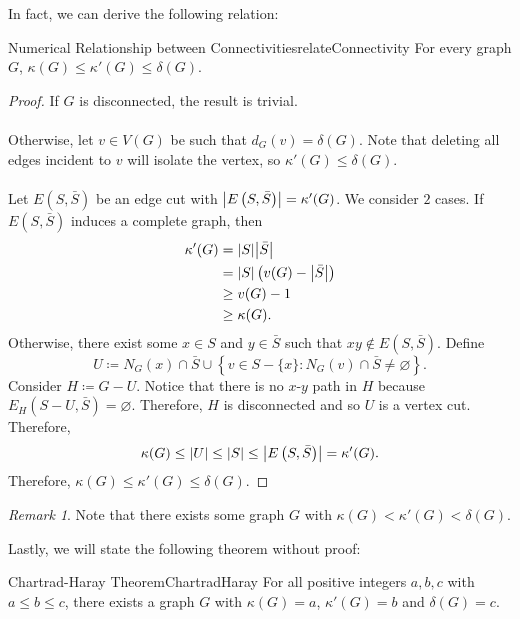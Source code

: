 \documentclass[math, code]{amznotes}
\theoremstyle{remark}
\newtheorem*{remark}{Remark}
\begin{document}
In fact, we can derive the following relation:
\begin{probox}{Numerical Relationship between Connectivities}{relateConnectivity}
    For every graph $G$, $\kappa(G) \leq \kappa'(G) \leq \delta(G)$.
    \tcblower
    \begin{proof}
        If $G$ is disconnected, the result is trivial. 
        \\\\
        Otherwise, let $v \in V(G)$ be such that $d_G(v) = \delta(G)$. Note that deleting all edges incident to $v$ will isolate the vertex, so $\kappa'(G) \leq \delta(G)$.
        \\\\
        Let $E\left(S, \bar{S}\right)$ be an edge cut with ${\left\lvert {E\left(S, \bar{S}\right)} \right\rvert} = \kappa'(G)$. We consider $2$ cases. If $E\left(S, \bar{S}\right)$ induces a complete graph, then 
        \begin{align*}
            \kappa'(G) & = {\left\lvert {S} \right\rvert}{\left\lvert {\bar{S}} \right\rvert} \\
            & = {\left\lvert {S} \right\rvert}\left(v(G) - {\left\lvert {\bar{S}} \right\rvert}\right) \\
            & \geq v(G) - 1 \\
            & \geq \kappa(G).
        \end{align*}
        Otherwise, there exist some $x \in S$ and $y \in \bar{S}$ such that $xy \notin E\left(S, \bar{S}\right)$. Define
        \begin{equation*}
            U \coloneqq N_G(x) \cap \bar{S} \cup \left\{v \in S - \{x\} \colon N_G(v) \cap \bar{S} \neq \varnothing\right\}.
        \end{equation*}
        Consider $H \coloneqq G - U$. Notice that there is no $x$-$y$ path in $H$ because $E_H\left(S - U, \bar{S}\right) = \varnothing$. Therefore, $H$ is disconnected and so $U$ is a vertex cut. Therefore,
        \begin{equation*}
            \kappa(G) \leq {\left\lvert {U} \right\rvert} \leq {\left\lvert {S} \right\rvert} \leq {\left\lvert {E\left(S, \bar{S}\right)} \right\rvert} = \kappa'(G).
        \end{equation*}
        Therefore, $\kappa(G) \leq \kappa'(G) \leq \delta(G)$.
    \end{proof}
\end{probox}
\begin{notebox}
    \begin{remark}
        Note that there exists some graph $G$ with $\kappa(G) < \kappa'(G) < \delta(G)$.
    \end{remark}
\end{notebox}
Lastly, we will state the following theorem without proof:
\begin{thmbox}{Chartrad-Haray Theorem}{ChartradHaray}
    For all positive integers $a, b, c$ with $a \leq b \leq c$, there exists a graph $G$ with $\kappa(G) = a$, $\kappa'(G) = b$ and $\delta(G) = c$.
\end{thmbox}
\end{document}
